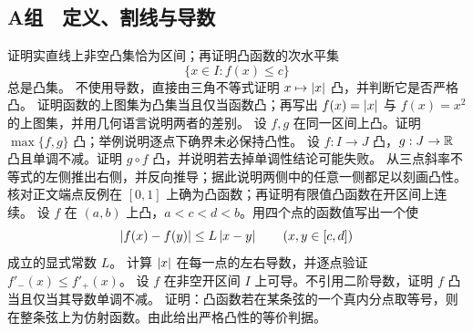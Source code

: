 \subsection*{A组　定义、割线与导数}
\begin{enumerate}[label=\textbf{\thechapter.\arabic*.}]
  证明实直线上非空凸集恰为区间；再证明凸函数的次水平集
 \[
  \{x\in I:f(x)\le c\}
 \]
 总是凸集。
  不使用导数，直接由三角不等式证明 \(x\mapsto\left|x\right|\) 凸，并判断它是否严格凸。
  证明函数的上图集为凸集当且仅当函数凸；再写出
 \(f(x)=\left|x\right|\) 与 \(f(x)=x^2\) 的上图集，并用几何语言说明两者的差别。
  设 \(f,g\) 在同一区间上凸。证明 \(\max\{f,g\}\) 凸；举例说明逐点下确界未必保持凸性。
  设 \(f:I\to J\) 凸，\(g:J\to\mathbb{R}\) 凸且单调不减。证明 \(g\circ f\) 凸，并说明若去掉单调性结论可能失败。
  从三点斜率不等式的左侧推出右侧，并反向推导；据此说明两侧中的任意一侧都足以刻画凸性。
  核对正文端点反例在 \([0,1]\) 上确为凸函数；再证明有限值凸函数在开区间上连续。
  设 \(f\) 在 \((a,b)\) 上凸，\(a<c<d<b\)。用四个点的函数值写出一个使
 \[
  \left|f(x)-f(y)\right|\le L\left|x-y\right|\qquad(x,y\in[c,d])
 \]
 成立的显式常数 \(L\)。
  计算 \(\left|x\right|\) 在每一点的左右导数，并逐点验证 \(f'_-(x)\le f'_+(x)\)。
  设 \(f\) 在非空开区间 \(I\) 上可导。不引用二阶导数，证明 \(f\) 凸当且仅当其导数单调不减。
  证明：凸函数若在某条弦的一个真内分点取等号，则在整条弦上为仿射函数。由此给出严格凸性的等价判据。
\end{enumerate}

